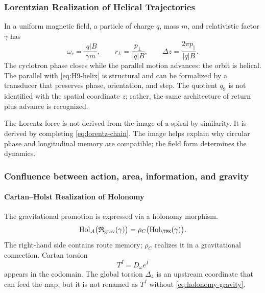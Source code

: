 \subsubsection{Lorentzian Realization of Helical Trajectories}

In a uniform magnetic field, a particle of charge \(q\), mass \(m\), and relativistic factor \(\gamma\) has
\begin{equation}
\omega_c=\frac{|q|B}{\gamma m},
\qquad
r_L=\frac{p_\perp}{|q|B},
\qquad
\Delta z=\frac{2\pi p_\parallel}{|q|B}.
\label{eq:lorentz-helix}
\end{equation}
The cyclotron phase closes while the parallel motion advances: the orbit is helical. The parallel with \eqref{eq:H9-helix} is structural and can be formalized by a transducer that preserves phase, orientation, and step. The quotient \(q_9\) is not identified with the spatial coordinate \(z\); rather, the same architecture of return plus advance is recognized.

The Lorentz force is not derived from the image of a spiral by similarity.
It is derived by completing \eqref{eq:lorentz-chain}. The image helps explain
why circular phase and longitudinal memory are compatible; the field
form determines the dynamics.

\subsubsection{Confluence between action, area, information, and gravity}

\paragraph{Cartan--Holst Realization of Holonomy}

The gravitational promotion is expressed via a holonomy morphism.
\begin{equation}
\operatorname{Hol}_{\mathcal A}
\bigl(\mathfrak R_{\mathrm{grav}}(\gamma)\bigr)
=\rho_C\bigl(\operatorname{Hol}_{\TPK}(\gamma)\bigr).
\label{eq:holonomy-gravity}
\end{equation}
The right-hand side contains route memory; \(\rho_C\) realizes it in a gravitational connection. Cartan torsion
\[
T^I=D_\omega e^I
\]
appears in the codomain. The global torsion \(\Delta_4\) is an upstream
coordinate that can feed the map, but it is not renamed as \(T^I\) without
\eqref{eq:holonomy-gravity}.

